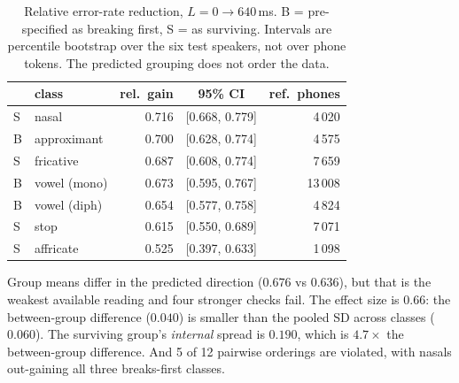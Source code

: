 \documentclass[journal]{IEEEtran}
\begin{document}
\begin{table}[t]
\centering\small
\caption{Relative error-rate reduction, $L{=}0\rightarrow640$\,ms. B =
pre-specified as breaking first, S = as surviving. Intervals are
percentile bootstrap over the six test speakers, not over phone
tokens. The predicted grouping does not order the data.}
\label{tab:h2}
\begin{tabular}{llrcr}
\toprule
& class & rel.\ gain & 95\% CI & ref.\ phones \\
\midrule
S & nasal        & 0.716 & [0.668, 0.779] & 4\,020 \\
B & approximant  & 0.700 & [0.628, 0.774] & 4\,575 \\
S & fricative    & 0.687 & [0.608, 0.774] & 7\,659 \\
B & vowel (mono) & 0.673 & [0.595, 0.767] & 13\,008 \\
B & vowel (diph) & 0.654 & [0.577, 0.758] & 4\,824 \\
S & stop         & 0.615 & [0.550, 0.689] & 7\,071 \\
S & affricate    & 0.525 & [0.397, 0.633] & 1\,098 \\
\bottomrule
\end{tabular}
\end{table}

Group means differ in the predicted direction ($0.676$ vs $0.636$), but that is
the weakest available reading and four stronger checks fail. The effect size
is $0.66$: the between-group difference ($0.040$) is smaller than the pooled SD
across classes ($0.060$). The surviving group's \emph{internal} spread is
$0.190$, which is $4.7\times$ the between-group difference. And 5 of 12 pairwise
orderings are violated, with nasals out-gaining all three breaks-first classes.
\end{document}
